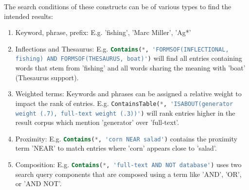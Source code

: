 The search conditions of these constructs can be of various types to find the intended results: \parencite[cf.][p. 9]{hamilton_microsoft_2001}
\begin{enumerate}
    \item Keyword, phrase, prefix: E.g. 'fishing', 'Marc Miller', 'Ag*'
    \item Inflections and Thesaurus: E.g. \lstinline[language=SQL]$Contains(*, 'FORMSOF(INFLECTIONAL, fishing) AND FORMSOF(THESAURUS, boat)')$ will find all entries containing words that stem from 'fishing' and all words sharing the meaning with 'boat' (Thesaurus support).
    \item Weighted terms: Keywords and phrases can be assigned a relative weight to impact the rank of entries. E.g. \lstinline[language=SQL]$ContainsTable(*, 'ISABOUT(generator weight (.7), full-text weight (.3))')$ will rank entries higher in the result corpus which mention 'generator' over 'full-text'.
    \item Proximity: E.g. \lstinline[language=SQL]$Contains(*, 'corn NEAR salad')$ contains the proximity term 'NEAR' to match entries where 'corn' appears close to 'salad'.
    \item Composition: E.g. \lstinline[language=SQL]$Contains(*, 'full-text AND NOT database')$ uses two search query components that are composed using a term like 'AND', 'OR', or 'AND NOT'.
\end{enumerate}
